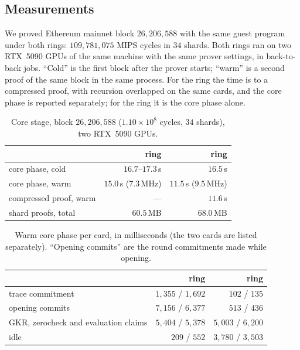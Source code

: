 \subsection{Measurements}\label{sec:core-measurements}

We proved Ethereum mainnet block $26{,}206{,}588$ with the same guest program under both rings: $109{,}781{,}075$ MIPS cycles in $34$ shards. Both rings ran on two RTX~5090 GPUs of the same machine with the same prover settings, in back-to-back jobs. ``Cold'' is the first block after the prover starts; ``warm'' is a second proof of the same block in the same process. For the \Poseidon{} ring the time is to a compressed proof, with recursion overlapped on the same cards, and the core phase is reported separately; for the \Blake{} ring it is the core phase alone.

\begin{table}[t]
\centering\small
\caption{Core stage, block $26{,}206{,}588$ ($1.10\times 10^8$ cycles, $34$ shards), two RTX~5090 GPUs.}
\label{tab:core}
\begin{tabular}{lrr}
\toprule
 & \Blake{} ring & \Poseidon{} ring \\
\midrule
core phase, cold & $16.7$--$17.3$\,s & $16.5$\,s \\
core phase, warm & $15.0$\,s ($7.3$\,MHz) & $11.5$\,s ($9.5$\,MHz) \\
compressed proof, warm & --- & $11.6$\,s \\
shard proofs, total & $60.5$\,MB & $68.0$\,MB \\
\bottomrule
\end{tabular}
\end{table}

\begin{table}[t]
\centering\small
\caption{Warm core phase per card, in milliseconds (the two cards are listed separately). ``Opening commits'' are the \WHIR{} round commitments made while opening.}
\label{tab:core-phases}
\begin{tabular}{lrr}
\toprule
 & \Blake{} ring & \Poseidon{} ring \\
\midrule
trace commitment & $1{,}355$ / $1{,}692$ & $102$ / $135$ \\
opening commits & $7{,}156$ / $6{,}377$ & $513$ / $436$ \\
GKR, zerocheck and evaluation claims & $5{,}404$ / $5{,}378$ & $5{,}003$ / $6{,}200$ \\
idle & $209$ / $552$ & $3{,}780$ / $3{,}503$ \\
\bottomrule
\end{tabular}
\end{table}

